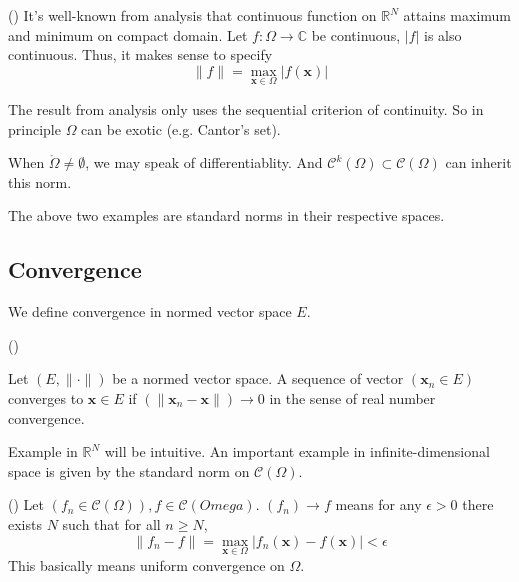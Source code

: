 \documentclass[10pt]{article}
\begin{document}
\begin{example} (\cite[Example 1.3.3]{intro-hilbert})
  It's well-known from analysis that continuous function on $\mathbb{R}^N$ attains maximum and minimum on compact domain. Let $f: \Omega \to \mathbb{C}$ be continuous, $|f|$ is also continuous. Thus, it makes sense to specify
  \begin{equation}
    \|f\| = \max\limits_{\mathbf{x} \in \Omega} |f(\mathbf{x})|
  \end{equation}
\end{example}
\begin{remark}
The result from analysis only uses the sequential criterion of continuity. So in principle $\Omega$ can be exotic (e.g. Cantor's set).
\end{remark}
\begin{remark}
When $\mathring{\Omega} \not = \emptyset$, we may speak of differentiablity. And $\mathcal{C}^k(\Omega)\subset \mathcal{C}(\Omega)$ can inherit this norm.
\end{remark}

The above two examples are standard norms in their respective spaces.

\subsection{Convergence}

We define convergence in normed vector space $E$.

\begin{definition}[Convergence] (\cite[Definition 1.3.6]{intro-hilbert})
  \label{def:convergence}

  Let $(E, \|\cdot\|)$ be a normed vector space. A sequence of vector $(\mathbf{x}_n \in E)$ converges to $\mathbf{x} \in E$ if $(\|\mathbf{x}_n - \mathbf{x}\|) \to 0$ in the sense of real number convergence.
\end{definition}

Example in $\mathbb{R}^N$ will be intuitive. An important example in infinite-dimensional space is given by the standard norm on $\mathcal{C}(\Omega)$.

\begin{example} (\cite[Example 1.3.7]{intro-hilbert})
  Let $(f_n \in \mathcal{C}(\Omega)), f \in \mathcal{C}(Omega)$. $(f_n) \to f$ means for any $\epsilon > 0$ there exists $N$ such that for all $n \geq N$,
  \begin{equation}
    \|f_n - f\| = \max\limits_{\mathbf{x} \in \Omega} |f_n(\mathbf{x}) - f(\mathbf{x})| < \epsilon
  \end{equation}
  This basically means uniform convergence on $\Omega$.
\end{example}
\end{document}
